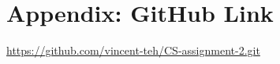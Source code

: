 \documentclass{article}
\begin{document}
%
%
%
%
%
%

\newpage
\section{Appendix: GitHub Link}%
\label{sec:Appendix: GitHub Link}
\url{https://github.com/vincent-teh/CS-assignment-2.git}
\end{document}
